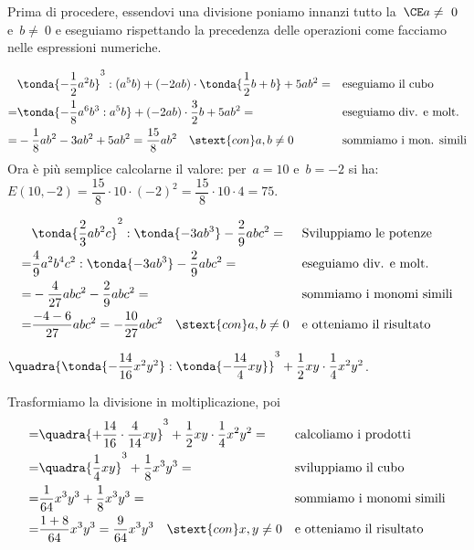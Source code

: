 Prima di procedere, essendovi una divisione poniamo innanzi tutto
la~\(\CE a \neq~0\) e~\(b \neq~0\) e eseguiamo rispettando la precedenza
delle operazioni come facciamo nelle espressioni numeriche.
\begin{esempio}{}{}
 \begin{align*}
 &\tonda{-{\frac{1}{2}}a^{2}b}^{3}:(a^{5}b)+
  (-2ab)\cdot\tonda{\frac{1}{2}b+b}+5ab^{2} =
&& \text{eseguiamo il cubo}\\
=&\tonda{-{\frac{1}{8}}a^{6}b^{3}:a^{5}b}+
  (-2ab)\cdot{\frac{3}{2}}b+5ab^{2} =
&& \text{eseguiamo div. e molt.}\\
=&-{\frac{1}{8}}ab^{2}-3ab^{2}+5ab^{2} 
= \frac{15}{8}ab^{2} \quad \stext{con} a, b \ne 0 
&& \text{sommiamo i mon. simili}
\end{align*}
Ora è più semplice calcolarne il valore: per~\(a=10\) e~\(b=-2\) si ha:\\
\(E(10, -2) =
  \dfrac{15}{8}\cdot 10\cdot(-2)^{2}=\dfrac{15}{8}\cdot 10\cdot 4=75\).
\end{esempio}

\begin{esempio}{}{}
 \begin{align*}
 &\tonda{\frac{2}{3}ab^{2}c}^{2}:\tonda{-3ab^{3}}-\frac{2}{9}abc^{2} =
&& \text{Sviluppiamo le potenze}\\
 =&\frac{4}{9}a^{2}b^{4}c^{2}:\tonda{-3ab^{3}}-\frac{2}{9}abc^{2} =
&& \text{eseguiamo div. e molt.}\\
 =&-{\frac{4}{27}}abc^{2}-\frac{2}{9}abc^{2} =
&& \text{sommiamo i monomi simili}\\
=&\frac{-4-6}{27}abc^{2} 
 =-{\frac{10}{27}}abc^{2} \quad \stext{con} a, b \ne 0 && 
  \text{e otteniamo il risultato}
 \end{align*}
\end{esempio}

\begin{esempio}{}{}
\(\quadra{\tonda{-{\dfrac{14}{16}}x^{2}y^{2}}:\tonda{-{\dfrac{14}{4}}
xy}}^{3}+\dfrac{1}{2}xy\cdot{\dfrac{1}{4}}x^{2}y^{2}\).

Trasformiamo la divisione in moltiplicazione, poi
\begin{align*}
 =&\quadra{+{\frac{14}{16}}\cdot{\frac{4}{14}}xy}^{3}+\frac{1}{2}xy\cdot 
{\frac{1}{4}}x^{2}y^{2}= && \text{calcoliamo i prodotti}\\
=&\quadra{\frac{1}{4}xy}^{3}+\frac{1}{8}x^{3}y^{3} =
&& \text{sviluppiamo il cubo}\\
=&\frac{1}{64}x^{3}y^{3}+\frac{1}{8}x^{3}y^{3}= && 
\text{sommiamo i monomi simili}\\
=&\frac{1+8}{64}x^{3}y^{3} 
=\frac{9}{64}x^{3}y^{3} \quad \stext{con} x, y \ne 0 && 
  \text{e otteniamo il risultato}
\end{align*}
\end{esempio}

